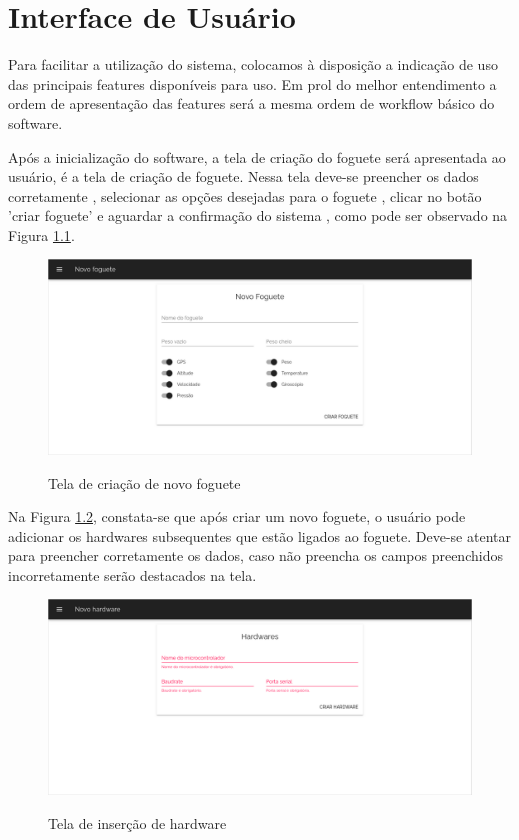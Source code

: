 \chapter{Interface de Usuário}

Para facilitar a utilização do sistema,  colocamos à disposição a indicação de uso das principais features disponíveis para uso. Em prol do melhor entendimento  a ordem de apresentação das features será a mesma ordem de workflow básico do software.

Após a inicialização do software, a tela de criação do foguete será apresentada ao usuário, é a tela de criação de foguete. Nessa tela deve-se preencher os dados corretamente , selecionar as opções desejadas para o foguete  , clicar no botão 'criar foguete' e aguardar a confirmação do sistema , como pode ser observado na Figura \ref{teladecriacao}. 
\begin{center}

\begin{figure}[H]
\centering				            \includegraphics[width=\textwidth]{Figuras/telas/1.png}
        \label{teladecriacao}
	\caption{Tela de criação de novo foguete}
\end{figure} 
\end{center}

Na Figura \ref{teladehardware}, constata-se que após criar um novo foguete, o usuário pode adicionar os hardwares subsequentes que estão ligados ao foguete. Deve-se atentar para preencher corretamente os dados, caso não preencha os campos preenchidos incorretamente serão destacados na tela.
\begin{center}
    \begin{figure}[H]
\centering					    \includegraphics[width=\textwidth]{Figuras/telas/2-error.png}
        \label{teladehardware}
	\caption{ Tela de inserção de hardware}
\end{figure} 
\end{center}


